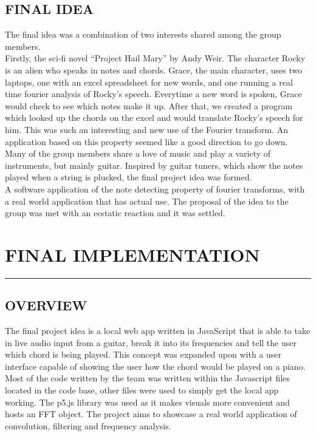 \documentclass[12pt,a4paper]{article}
\begin{document}
	\subsection{FINAL IDEA}
		The final idea was a combination of two interests shared among the group members.\\
		Firstly, the sci-fi novel “Project Hail Mary” by Andy Weir. The character Rocky is an alien who speaks in notes and chords. Grace, the main character, uses two laptops, one with an excel spreadsheet for new words, and one running a real time fourier analysis of Rocky’s speech. Everytime a new word is spoken, Grace would check to see which notes make it up. After that, we created a program which looked up the chords on the excel and would translate Rocky’s speech for him. This was such an interesting and new use of the Fourier transform. An application based on this property seemed like a good direction to go down.\\
		Many of the group members share a love of music and play a variety of instruments, but mainly guitar. Inspired by guitar tuners, which show the notes played when a string is plucked, the final project idea was formed.\\
		A software application of the note detecting property of fourier transforms, with a real world application that has actual use. The proposal of the idea to the group was met with an ecstatic reaction and it was settled.\\
	
\newpage

\Large
\section{FINAL IMPLEMENTATION}
\vspace{-5mm}
\rule{\linewidth}{0.1mm}
\large
	\normalsize
	\subsection{OVERVIEW}
			The final project idea is a local web app written in JavaScript that is able to take in live audio input from a guitar, break it into its frequencies and tell the user which chord is being
			played. This concept was expanded upon with a user interface capable of showing the user how the chord would be played on a piano. Most of the code written by the team was written within the 
			Javascript files located in the code base, other files were used to simply get the local app working. The p5.js library was used as it makes visuals more convenient and hosts an FFT 
			object. The project aims to showcase a real world application of convolution, filtering and frequency analysis.
\end{document}
